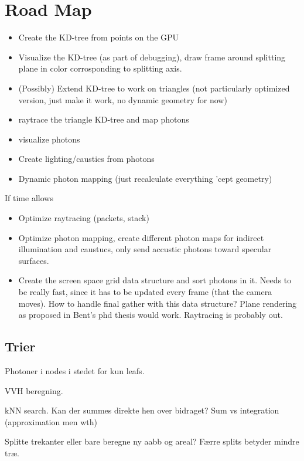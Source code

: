\section*{Road Map}

\begin{itemize}
\item Create the KD-tree from points on the GPU
\item Visualize the KD-tree (as part of debugging), draw frame around
  splitting plane in color corrosponding to splitting axis.
\item (Possibly) Extend KD-tree to work on triangles (not particularly optimized
  version, just make it work, no dynamic geometry for now)
\item raytrace the triangle KD-tree and map photons
\item visualize photons
\item Create lighting/caustics from photons
\item Dynamic photon mapping (just recalculate everything 'cept geometry)
\end{itemize}

If time allows

\begin{itemize}
\item Optimize raytracing (packets, stack)
\item Optimize photon mapping, create different photon maps for
  indirect illumination and caustucs, only send accustic photons
  toward specular surfaces.
\item Create the screen space grid data structure and sort photons in
  it. Needs to be really fast, since it has to be updated every frame
  (that the camera moves). How to handle final gather with this data
  structure? Plane rendering as proposed in Bent's phd thesis would
  work. Raytracing is probably out.
\end{itemize}



\subsection*{Trier}

Photoner i nodes i stedet for kun leafs.

VVH beregning.

kNN search. Kan der summes direkte hen over bidraget? Sum vs
integration (approximation men wth)

Splitte trekanter eller bare beregne ny aabb og areal? Færre splits
betyder mindre træ.

